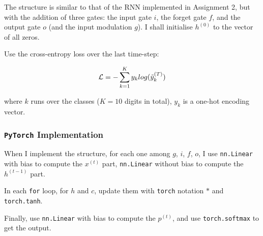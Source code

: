 The structure is similar to that of the RNN implemented in Assignment 2, but with the addition of three gates: the input gate $i$, the forget gate $f$, and the output gate $o$ (and the input modulation $g$).
I shall initialise $h^{(0)}$ to the vector of all zeros.

Use the cross-entropy loss over the last time-step:

\begin{equation}
  \mathcal{L} = -\sum\limits_{k=1}^{K}y_{k}log(\Tilde{y}_{k}^{(T)})
\end{equation}

where $k$ runs over the classes ($K = 10$ digits in total), $y_k$ is a one-hot encoding vector.

\subsubsection{\texttt{PyTorch} Implementation}

When I implement the structure, for each one among $g$, $i$, $f$, $o$, I use \texttt{nn.Linear} with bias to compute the $x^{(t)}$ part, \texttt{nn.Linear} without bias to compute the $h^{(t-1)}$ part.

In each \texttt{for} loop, for $h$ and $c$, update them with \texttt{torch} notation $*$ and \texttt{torch.tanh}.

Finally, use \texttt{nn.Linear} with bias to compute the $p^{(t)}$, and use \texttt{torch.softmax} to get the output.
